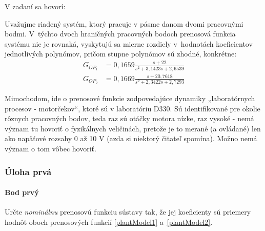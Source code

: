 \documentclass[a4paper, 10pt, ]{article}
\begin{document}
V zadaní sa hovorí:

\smallskip

{\color{gray}

\noindent
Uvažujme riadený systém, ktorý pracuje v pásme danom dvomi pracovnými bodmi. V~týchto dvoch hraničných pracovných bodoch prenosová funkcia systému nie je rovnaká, vyskytujú sa mierne rozdiely v~hodnotách koeficientov jednotlivých polynómov, pričom stupne polynómov sú zhodné, konkrétne:
\begin{align*}
    G_{OP_1} &= 0,1659 \frac{s + 22}{ s^2 + 3,1423 s + 2,6539} 	\\
    G_{OP_2} &= 0,1669 \frac{s + 20,7618}{s^2 + 2,3422s + 2,7293}
\end{align*}

}

\smallskip

Mimochodom, ide o prenosové funkcie zodpovedajúce dynamiky „laboratórnych procesov - motorčekov“, ktoré sú v laboratóriu D330. Sú identifikované pre okolie rôznych pracovných bodov, teda raz sú otáčky motora nízke, raz vysoké - nemá význam tu hovoriť o fyzikálnych veličinách, pretože je to merané (a ovládané) len ako napäťové rozsahy 0 až 10 V (azda si niektorý čitateľ spomína). Možno nemá význam o tom vôbec hovoriť.



\subsubsection{Úloha prvá}


\paragraph{Bod prvý}


\smallskip

{\color{gray}

Určte \emph{nominálnu} prenosovú funkciu sústavy tak, že jej koeficienty sú priemery hodnôt oboch prenosových funkcií \eqref{plantModel1} a~\eqref{plantModel2}.

}

\smallskip
\end{document}
